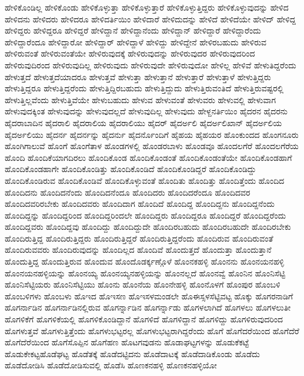 {ಹೇಳಿಕೊಂಡಿಲ್ಲ
ಹೇಳಿಕೊಂಡು
ಹೇಳಿಕೊಳ್ಳುತ್ತಾ
ಹೇಳಿಕೊಳ್ಳುತ್ತಾರೆ
ಹೇಳಿಕೊಳ್ಳುತ್ತಿದ್ದರು
ಹೇಳಿಕೊಳ್ಳುವುದನ್ನು
ಹೇಳಿದ
ಹೇಳಿದನು
ಹೇಳಿದರು
ಹೇಳಿದರೂ
ಹೇಳಿದರ್ತಿಯಿಂ
ಹೇಳಿದಾರೆ
ಹೇಳಿದುದನ್ನು
ಹೇಳಿದೆ
ಹೇಳಿದೆಯೇ
ಹೇಳಿದ್
ಹೇಳಿದ್ದ
ಹೇಳಿದ್ದರು
ಹೇಳಿದ್ದರೂ
ಹೇಳಿದ್ದರೆ
ಹೇಳಿದ್ದಾನೆ
ಹೇಳಿದ್ದಾನೆಂದು
ಹೇಳಿದ್ದಾನ್
ಹೇಳಿದ್ದಾರೆ
ಹೇಳಿದ್ದಾರೆಂದು
ಹೇಳಿದ್ದಾರೆಂದೂ
ಹೇಳಿದ್ದಾರೋ
ಹೇಳಿದ್ದಾರ್
ಹೇಳಿದ್ದಾಳೆ
ಹೇಳಿದ್ದು
ಹೇಳಿದ್ದೇನೆ
ಹೇಳಿರಬಹುದು
ಹೇಳಿರುವ
ಹೇಳಿರುವಂತೆ
ಹೇಳಿರುವಂತೆಯೇ
ಹೇಳಿರುವುದಕ್ಕೆ
ಹೇಳಿರುವುದನ್ನು
ಹೇಳಿರುವುದರ
ಹೇಳಿರುವುದರಿಂದ
ಹೇಳಿರುವುದಿರಂದ
ಹೇಳಿರುವುದಿಲ್ಲ
ಹೇಳಿರುವುದು
ಹೇಳಿರುವುದೇ
ಹೇಳಿರುವುದೋ
ಹೇಳಿಲ್ಲ
ಹೇಳಿವೆ
ಹೇಳುತಿದ್ದರೆಂದು
ಹೇಳುತ್ತದೆ
ಹೇಳುತ್ತದೆಯಾದರೂ
ಹೇಳುತ್ತವೆ
ಹೇಳುತ್ತಾ
ಹೇಳುತ್ತಾನೆ
ಹೇಳುತ್ತಾರೆ
ಹೇಳುತ್ತಾಳೆ
ಹೇಳುತ್ತಿದ್ದರು
ಹೇಳುತ್ತಿದ್ದರೂ
ಹೇಳುತ್ತಿದ್ದರೆಂದು
ಹೇಳುತ್ತಿದ್ದಿರಬಹುದು
ಹೇಳುತ್ತಿದ್ದುದು
ಹೇಳುತ್ತಿರುವಂತಿದೆ
ಹೇಳುತ್ತಿರುವಷ್ಟರಲ್ಲಿ
ಹೇಳುತ್ತಿಲ್ಲವೆಂದು
ಹೇಳುತ್ತಿವೆಯೇ
ಹೇಳುಬಹುದು
ಹೇಳುವ
ಹೇಳುವಂತೆ
ಹೇಳುವರು
ಹೇಳುವಲ್ಲಿ
ಹೇಳುವಾಗ
ಹೇಳುವುದಕ್ಕಿಂತ
ಹೇಳುವುದನ್ನು
ಹೇಳುವುದಲ್ಲದೆ
ಹೇಳುವುದಿಲ್ಲ
ಹೇಳುವುದು
ಹೇಳ್ದನರ್ತಿಯಿಂ
ಹೈದರನ
ಹೈದರನು
ಹೈದರಾಬಾದಿನ
ಹೈದರಾಲಿ
ಹೈದರಾಲಿಯ
ಹೈದರಾಲಿಯು
ಹೈದರ್
ಹೈದರ್ಅಲಿ
ಹೈದರ್ಅಲಿಖಾನ್
ಹೈದರ್ಅಲಿಯ
ಹೈದರ್ಅಲಿಯು
ಹೈದರ್ನ
ಹೈದರ್ನನ್ನು
ಹೈದರ್ನು
ಹೈದರ್ನೊಂದಿಗೆ
ಹೈಹಯ
ಹೈಹಯರ
ಹೊಂಕುಂದದ
ಹೊಂಗನೂರು
ಹೊಂಗಿಗಾಲುವೆ
ಹೊಂಗೆ
ಹೊಂಗೆತಾಳ
ಹೊಂಡಗಳಲ್ಲಿ
ಹೊಂಡರಬಾಳು
ಹೊಂಡವೂ
ಹೊಂದಲಗೆರೆ
ಹೊಂದಲಗೆರೆಯ
ಹೊಂದಿ
ಹೊಂದಿಕೆಯಾಗದಿರಲು
ಹೊಂದಿಕೊಂಡ
ಹೊಂದಿಕೊಂಡಂತೆ
ಹೊಂದಿಕೊಂಡಂತೆಯೇ
ಹೊಂದಿಕೊಂಡಹಾಗೆ
ಹೊಂದಿಕೊಂಡಹಾಗೇ
ಹೊಂದಿಕೊಂಡಿತ್ತು
ಹೊಂದಿಕೊಂಡಿದೆ
ಹೊಂದಿಕೊಂಡಿದ್ದರೆ
ಹೊಂದಿಕೊಂಡಿದ್ದು
ಹೊಂದಿಕೊಂಡಿರುವ
ಹೊಂದಿಕೊಂಡಿವೆ
ಹೊಂದಿಕೊಳ್ಳುವಂತೆ
ಹೊಂದಿತು
ಹೊಂದಿತ್ತು
ಹೊಂದಿತ್ತೆಂದು
ಹೊಂದಿದ
ಹೊಂದಿದನು
ಹೊಂದಿದನೆಂದು
ಹೊಂದಿದನೆಂದೂ
ಹೊಂದಿದರು
ಹೊಂದಿದರೆಂದೂ
ಹೊಂದಿದವರ
ಹೊಂದಿದವರಿರಬೇಕು
ಹೊಂದಿದವರು
ಹೊಂದಿದಾಗ
ಹೊಂದಿದೆ
ಹೊಂದಿದ್ದ
ಹೊಂದಿದ್ದನು
ಹೊಂದಿದ್ದನೆಂದು
ಹೊಂದಿದ್ದನ್ನು
ಹೊಂದಿದ್ದರಿಂದ
ಹೊಂದಿದ್ದರಿಂದಲೇ
ಹೊಂದಿದ್ದರು
ಹೊಂದಿದ್ದರೂ
ಹೊಂದಿದ್ದರೆ
ಹೊಂದಿದ್ದರೆಂದು
ಹೊಂದಿದ್ದವರು
ಹೊಂದಿದ್ದವು
ಹೊಂದಿದ್ದು
ಹೊಂದಿದ್ದುದೇ
ಹೊಂದಿರಬಹುದು
ಹೊಂದಿರಬಹುದೇ
ಹೊಂದಿರಬೇಕು
ಹೊಂದಿರುತ್ತಿದ್ದ
ಹೊಂದಿರುತ್ತಿದ್ದರು
ಹೊಂದಿರುತ್ತಿದ್ದರೆ
ಹೊಂದಿರುತ್ತಿದ್ದರೆಂದು
ಹೊಂದಿರುವ
ಹೊಂದಿರುವಂತೆ
ಹೊಂದಿರುವವರು
ಹೊಂದಿರುವುದನ್ನು
ಹೊಂದಿಲ್ಲದ
ಹೊಂದಿವೆ
ಹೊಂದುತ್ತದೆ
ಹೊಂದುತ್ತಾ
ಹೊಂದುತ್ತಾನೆ
ಹೊಂದುತ್ತಿದ್ದ
ಹೊಂದುತ್ತಿರುವ
ಹೊಂದುವ
ಹೊಂದೊಡರ್ಕ್ಕಣ್ಗೊಳೆ
ಹೊಂನಕಹಳ್ಳಿ
ಹೊಂನನು
ಹೊಂನಯನಹಳ್ಳಿ
ಹೊಂನಯನಹಳ್ಳಿಯನ್ನು
ಹೊಂನಯ್ಯ
ಹೊಂನಯ್ಯನಹಳ್ಳಿಯನ್ನು
ಹೊಂನಲ್ಲದೆ
ಹೊಂನವ್ವೆ
ಹೊಂನಿನ
ಹೊಂನಿಸೆಟ್ಟಿ
ಹೊಂನಿಸೆಟ್ಟಿಯರು
ಹೊಂನಿಸೆಟ್ಟಿಯು
ಹೊಂನು
ಹೊಂನೆಯ
ಹೊಂನೇಹಳ್ಳಿ
ಹೊಂನೊಳಗೆ
ಹೊಂಪುರ
ಹೊಂಬಳಿ
ಹೊಂಬಳಿಗಳು
ಹೊಂಬಳು
ಹೊಇದ
ಹೊಇಸಣ
ಹೊಇಸಳಮಂಡಲೇ
ಹೊಈಸ್ಸಳಸೆಟ್ಟಿವಟ್ಟ
ಹೊಕ್ಕು
ಹೊಗರನಾಡಿಗೆ
ಹೊಗರ್ನಾಡಿನ
ಹೊಗರ್ನಾಡಿನಲ್ಲಿರುವ
ಹೊಗರ್ನ್ನಾಡಿನ
ಹೊಗರ್ನ್ನಾಡು
ಹೊಗಳಲಾಗಿದೆ
ಹೊಗಳಲು
ಹೊಗಳಲುತೀ
ಹೊಗಳಿಕೆಗೆ
ಹೊಗಳಿಕೆಯಲ್ಲಿ
ಹೊಗಳಿಕೊಂಡಿದ್ದಾನೆ
ಹೊಗಳಿದೆ
ಹೊಗಳಿದ್ದಾನೆ
ಹೊಗಳಿದ್ದು
ಹೊಗಳಿರುವುದರಿಂದ
ಹೊಗಳುತ್ತವೆ
ಹೊಗಳುತ್ತಿತ್ತೆಂದು
ಹೊಗಳುಭಟ್ಟರಲ್ಲ
ಹೊಗಳುಭಟ್ಟರಾಗಿದ್ದರೆಂದು
ಹೊಗೆ
ಹೊಗೆದರೆಯಿಂದ
ಹೊಗೆದೆರೆ
ಹೊಗೆದೆರೆಯಿಂದ
ಹೊಗೆಸೊಪ್ಪಿನ
ಹೊಗೆಹಣ
ಹೊಟಗವುಡನು
ಹೊಡಾಘಟ್ಟಗಳನ್ನು
ಹೊಡುಕೆಕಟ್ಟೆ
ಹೊಡುಕೇಕಟ್ಟಹೊಡೆಘಟ್ಟ
ಹೊಡೆತಕ್ಕೆ
ಹೊಡೆದಟ್ಟಿದನು
ಹೊಡೆದಾಟಕ್ಕೆ
ಹೊಡೆದಾಡಿಕೊಂಡು
ಹೊಡೆದು
ಹೊಡೆದೋಡಿಸಿ
ಹೊಡೆದೋಡಿಸುವಲ್ಲಿ
ಹೊಡೆಸಿ
ಹೊಣಕನಹಳ್ಳಿ
ಹೊಣಕನಹಳ್ಳಿಯೋ
}
